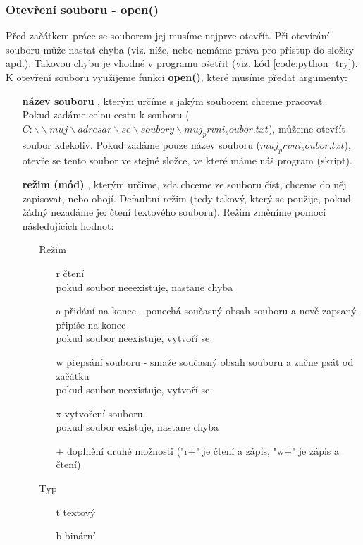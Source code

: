 \subsubsection{Otevření souboru - open()}
Před začátkem práce se souborem jej musíme nejprve otevřít. Při otevírání souboru může nastat chyba (viz. níže, nebo nemáme práva pro přístup do složky apd.). Takovou chybu je vhodné v programu ošetřit (viz. kód \ref{code:python_try}).\\
K otevření souboru využijeme funkci \textbf{open()}, které musíme předat argumenty:
\begin{itemize}
\item[\textbf{název souboru}] , kterým určíme s jakým souborem chceme pracovat.\\Pokud zadáme celou cestu k souboru ($C:\backslash\backslash muj\backslash adresar\backslash se\backslash soubory\backslash muj_prvni_soubor.txt$), můžeme otevřít soubor kdekoliv. Pokud zadáme pouze název souboru ($muj_prvni_soubor.txt$), otevře se tento soubor ve stejné složce, ve které máme náš program (skript).
\item[\textbf{režim (mód)}] , kterým určime, zda chceme ze souboru číst, chceme do něj zapisovat, nebo obojí. Defaultní režim (tedy takový, který se použije, pokud žádný nezadáme je: čtení textového souboru). Režim změníme pomocí následujících hodnot:
	\begin{itemize}
	\item[Režim]
		\begin{itemize}
		\item[r] čtení\\pokud soubor neeexistuje, nastane chyba
		\item[a] přidání na konec - ponechá současný obsah souboru a nově zapsaný připíše na konec\\pokud soubor neexistuje, vytvoří se
		\item[w] přepsání souboru - smaže současný obsah souboru a začne psát od začátku\\pokud soubor neexistuje, vytvoří se
		\item[x] vytvoření souboru\\pokud soubor existuje, nastane chyba
		\item[+] doplnění druhé možnosti ("r+" je čtení a zápis, "w+" je zápis a čtení)
		\end{itemize}
	\item[Typ]
		\begin{itemize}
		\item[t] textový
		\item[b] binární
		\end{itemize}
	\end{itemize}
\end{itemize}

